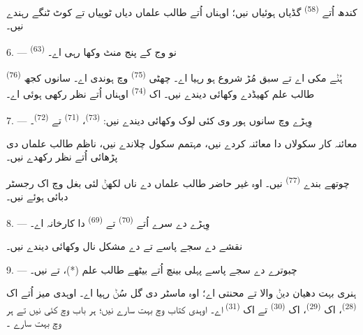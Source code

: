 کندھ اُتے  \textsuperscript{(58)} گڈیاں ہوئیاں نیں؛ اوہناں اُتے
طالب علماں دیاں ٹوپیاں تے کوٹ ٹنگے رہندے نیں۔

\VUsaut{5.2mm}
\VUsaut{3.6mm}

6. ---  \textsuperscript{(63)} نو وج کے پنج منٹ وکھا رہی اے۔

 \textsuperscript{(76)} ہُݨے مکی اے تے سبق مُڑ شروع ہو رہیا اے۔ چھٹی
 \textsuperscript{(75)} وچ ہوندی اے۔ سانوں کجھ طالب علم کھیڈدے
وکھائی دیندے نیں۔ اک  \textsuperscript{(74)} اوہناں اُتے نظر
رکھی ہوئی اے۔

7. --- وِہڑے وچ سانوں ہور وی کئی لوک وکھائی دیندے نیں: 
\textsuperscript{(73)}،  \textsuperscript{(71)} تے 
\textsuperscript{(72)}۔

معائنہ کار سکولاں دا معائنہ کردے نیں، مہتمم سکول چلاندے نیں، ناظم طالب علماں دی
پڑھائی اُتے نظر رکھدے نیں۔

چوتھے بندے  \textsuperscript{(77)} نیں۔ اوہ غیر حاضر طالب علماں دے
ناں لکھݨ لئی بغل وچ اک رجسٹر دبائی ہوئے نیں۔

8. --- وِہڑے دے سرے اُتے  \textsuperscript{(70)} تے
 \textsuperscript{(69)} دا کارخانہ اے۔

نقشے دے سجے پاسے  تے  دے  مشکل نال
وکھائی دیندے نیں۔


\VUsaut{2.4mm}

\VUsaut{3.0mm}

9. --- چبوترے دے سجے پاسے پہلی بینچ اُتے بیٹھے طالب علم  (*)،
 تے  نیں۔

ہنری بہت دھیان دیݨ والا تے محنتی اے؛ اوہ ماسٹر دی گل سُݨ رہیا اے۔ اوہدی میز
اُتے اک  \textsuperscript{(28)}، اک 
\textsuperscript{(29)}، اک  \textsuperscript{(30)} تے اک
 \textsuperscript{(31)} اے۔ اوہدی کتاب وچ بہت سارے 
نیں؛ ہر باب وچ کئی  نیں تے ہر  وچ بہت سارے
۔

